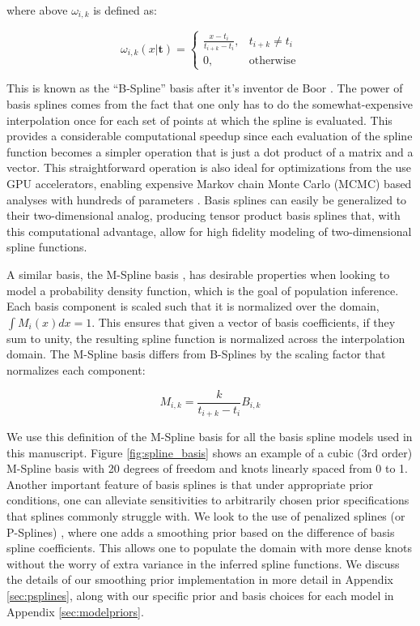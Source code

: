 \noindent where above $\omega_{i,k}$ is defined as:

\begin{equation}
\omega_{i,k}(x | \mathbf{t}) =
\begin{cases}
    \frac{x-t_i}{t_{i+k}-t_i}, & t_{i+k} \neq t_i \\
    0, & \text{otherwise}
\end{cases}
\end{equation}

\noindent This is known as the ``B-Spline'' basis after it's inventor de Boor \citep{deBoor78}. The power of basis splines
comes from the fact that one only has to do the somewhat-expensive interpolation once for each set of points at which the spline is evaluated. 
This provides a considerable computational speedup since each evaluation of the spline function becomes a simpler operation that is just
a dot product of a matrix and a vector. This straightforward operation is also ideal for optimizations from the use GPU accelerators, 
enabling expensive Markov chain Monte Carlo (MCMC) based analyses with hundreds of parameters . 
Basis splines can easily be generalized to their two-dimensional analog, producing tensor product basis splines that, 
with this computational advantage, allow for high fidelity modeling of two-dimensional spline functions.

A similar basis, the M-Spline basis \citep{monotone_regression_splines}, has desirable properties when looking to model a probability density function, 
which is the goal of population inference. Each basis component is scaled such that it is normalized over the domain, $\int M_i(x)dx = 1$. This ensures 
that given a vector of basis coefficients, if they sum to unity, the resulting spline function is normalized across the interpolation domain. 
The M-Spline basis differs from B-Splines by the scaling factor that normalizes each component:

\begin{equation}\label{eq:MB_SplineRelation}
M_{i,k} = \frac{k}{t_{i+k} - t_i} B_{i,k}
\end{equation}

\noindent We use this definition of the M-Spline basis for all the basis spline models used in this manuscript. Figure \ref{fig:spline_basis} 
shows an example of a cubic (3rd order) M-Spline basis with 20 degrees of freedom and knots linearly spaced from 0 to 1.
Another important feature of basis splines is that under appropriate prior conditions, one can alleviate sensitivities to arbitrarily 
chosen prior specifications that splines commonly struggle with. We look to the use of penalized splines (or P-Splines) \citep{eilers2021practical,BayesianPSplines,Jullion2007RobustSO}, 
where one adds a smoothing prior based on the difference of basis spline coefficients. This allows one to populate the domain with more dense knots 
without the worry of extra variance in the inferred spline functions. We discuss the details of our smoothing prior implementation 
in more detail in Appendix \ref{sec:psplines}, along with our specific prior and basis choices for each model in Appendix \ref{sec:modelpriors}.
